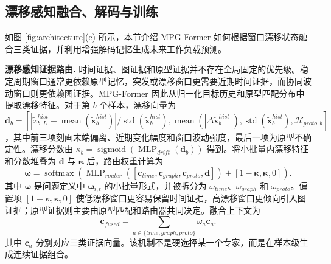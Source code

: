 \documentclass[UTF8]{ctexart}
\begin{document}
\subsection{漂移感知融合、解码与训练}
\label{sec:fusion_decoding}

如图 \ref{fig:architecture}(e) 所示，本节介绍 MPG-Former 如何根据窗口漂移状态融合三类证据，并利用增强解码记忆生成未来工作负载预测。

\noindent\textbf{漂移感知证据路由.}
时间证据、图证据和原型证据并不存在全局固定的优先级。稳定周期窗口通常更依赖原型记忆，突发或漂移窗口更需要近期时间证据，而协同波动窗口则更依赖图证据。MPG-Former 因此从归一化目标历史和原型匹配分布中提取漂移特征。对于第 $b$ 个样本，漂移向量为 $\mathbf d_b=[|\tilde{x}^{hist}_{b,L}-\operatorname{mean}(\tilde{\mathbf x}^{hist}_b)|/\operatorname{std}(\tilde{\mathbf x}^{hist}_b),\operatorname{mean}(|\Delta\tilde{\mathbf x}^{hist}_b|),\operatorname{std}(\tilde{\mathbf x}^{hist}_b),\mathcal H_{proto,b}]$，其中前三项刻画末端偏离、近期变化幅度和窗口波动强度，最后一项为原型不确定性。漂移分数由 $\kappa_b=\operatorname{sigmoid}(\operatorname{MLP}_{drift}(\mathbf d_b))$ 得到。将小批量内漂移特征和分数堆叠为 $\mathbf d$ 与 $\boldsymbol{\kappa}$ 后，路由权重计算为
\begin{equation}
    \boldsymbol{\omega}=\operatorname{softmax}(\operatorname{MLP}_{router}([\mathbf c_{time},\mathbf c_{graph},\mathbf c_{proto},\mathbf d]) + [1-\boldsymbol{\kappa},\boldsymbol{\kappa},0]).
    \label{eq:mpg_router_new}
\end{equation}
其中 $\boldsymbol{\omega}$ 是问题定义中 $\boldsymbol{\omega}_{i,t}$ 的小批量形式，并被拆分为 $\omega_{time}$、$\omega_{graph}$ 和 $\omega_{proto}$。偏置项 $[1-\boldsymbol{\kappa},\boldsymbol{\kappa},0]$ 使低漂移窗口更容易保留时间证据，高漂移窗口更倾向引入图证据；原型证据则主要由原型匹配和路由器共同决定。融合上下文为
\begin{equation}
    \mathbf c_{fused}=\sum_{a\in\{time,graph,proto\}}\omega_a\mathbf c_a.
    \label{eq:mpg_fusion_new}
\end{equation}
其中 $\mathbf c_a$ 分别对应三类证据向量。该机制不是硬选择某一个专家，而是在样本级生成连续证据组合。
\end{document}
